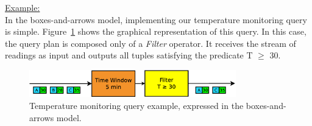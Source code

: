 
\underline{Example:}\\
In the boxes-and-arrows model, implementing our temperature monitoring query is simple. 
Figure~\ref{fig:baa-example} shows the graphical representation of this query.
In this case, the query plan is composed only of a \emph{Filter} operator. It receives the stream of 
readings as input and outputs all tuples satisfying the predicate T $\geq$ 30. 

\begin{figure}[t]
    \centering
    \includegraphics[width=0.8\textwidth]{img/tesi/baa-example}
    \caption{Temperature monitoring query example, expressed in the boxes-and-arrows model.}
    \label{fig:baa-example}
\end{figure}